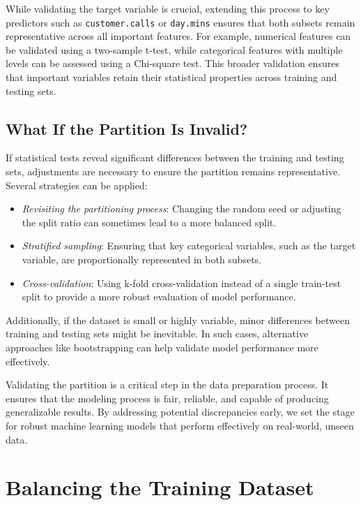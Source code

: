 \documentclass[
]{book}
\newcommand{\passthrough}[1]{#1}
\providecommand{\tightlist}{%
  \setlength{\itemsep}{0pt}\setlength{\parskip}{0pt}}
\theoremstyle{definition}
\theoremstyle{definition}
\theoremstyle{definition}
\theoremstyle{definition}
\theoremstyle{remark}
\begin{document}
While validating the target variable is crucial, extending this process to key predictors such as \passthrough{\lstinline!customer.calls!} or \passthrough{\lstinline!day.mins!} ensures that both subsets remain representative across all important features. For example, numerical features can be validated using a two-sample t-test, while categorical features with multiple levels can be assessed using a Chi-square test. This broader validation ensures that important variables retain their statistical properties across training and testing sets.

\subsection*{What If the Partition Is Invalid?}\label{what-if-the-partition-is-invalid}

If statistical tests reveal significant differences between the training and testing sets, adjustments are necessary to ensure the partition remains representative. Several strategies can be applied:

\begin{itemize}
\tightlist
\item
  \emph{Revisiting the partitioning process}: Changing the random seed or adjusting the split ratio can sometimes lead to a more balanced split.
\item
  \emph{Stratified sampling}: Ensuring that key categorical variables, such as the target variable, are proportionally represented in both subsets.
\item
  \emph{Cross-validation}: Using k-fold cross-validation instead of a single train-test split to provide a more robust evaluation of model performance.
\end{itemize}

Additionally, if the dataset is small or highly variable, minor differences between training and testing sets might be inevitable. In such cases, alternative approaches like bootstrapping can help validate model performance more effectively.

Validating the partition is a critical step in the data preparation process. It ensures that the modeling process is fair, reliable, and capable of producing generalizable results. By addressing potential discrepancies early, we set the stage for robust machine learning models that perform effectively on real-world, unseen data.

\section{Balancing the Training Dataset}\label{balancing-the-training-dataset}
\end{document}
